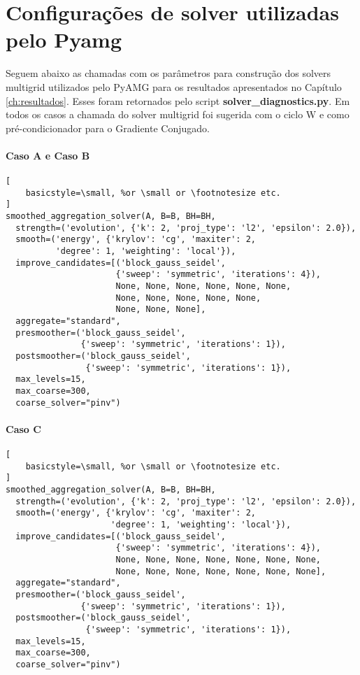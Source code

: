 \chapter{Configurações de solver utilizadas pelo Pyamg} \label{ch:pyamgSolver}


Seguem abaixo as chamadas com os parâmetros para construção dos solvers multigrid  utilizados pelo PyAMG para os resultados apresentados no Capítulo \ref{ch:resultados}. Esses foram retornados pelo script \textbf{solver\_diagnostics.py}. Em todos os casos a chamada do solver multigrid foi sugerida com o ciclo W e como pré-condicionador para o Gradiente Conjugado. 


\subsubsection{Caso A e Caso B}

\begin{lstlisting}[
    basicstyle=\small, %or \small or \footnotesize etc.
]
smoothed_aggregation_solver(A, B=B, BH=BH,
  strength=('evolution', {'k': 2, 'proj_type': 'l2', 'epsilon': 2.0}),
  smooth=('energy', {'krylov': 'cg', 'maxiter': 2, 
          'degree': 1, 'weighting': 'local'}),
  improve_candidates=[('block_gauss_seidel', 
                      {'sweep': 'symmetric', 'iterations': 4}), 
                      None, None, None, None, None, None,
                      None, None, None, None, None,
                      None, None, None],
  aggregate="standard",
  presmoother=('block_gauss_seidel', 
               {'sweep': 'symmetric', 'iterations': 1}),
  postsmoother=('block_gauss_seidel', 
                {'sweep': 'symmetric', 'iterations': 1}),
  max_levels=15,
  max_coarse=300,
  coarse_solver="pinv")
\end{lstlisting}

\subsubsection{Caso C}

\begin{lstlisting}[
    basicstyle=\small, %or \small or \footnotesize etc.
]
smoothed_aggregation_solver(A, B=B, BH=BH,
  strength=('evolution', {'k': 2, 'proj_type': 'l2', 'epsilon': 2.0}),
  smooth=('energy', {'krylov': 'cg', 'maxiter': 2, 
                     'degree': 1, 'weighting': 'local'}),
  improve_candidates=[('block_gauss_seidel', 
                      {'sweep': 'symmetric', 'iterations': 4}), 
                      None, None, None, None, None, None, None, 
                      None, None, None, None, None, None, None],
  aggregate="standard",
  presmoother=('block_gauss_seidel', 
               {'sweep': 'symmetric', 'iterations': 1}),
  postsmoother=('block_gauss_seidel', 
                {'sweep': 'symmetric', 'iterations': 1}),
  max_levels=15,
  max_coarse=300,
  coarse_solver="pinv")
\end{lstlisting}


